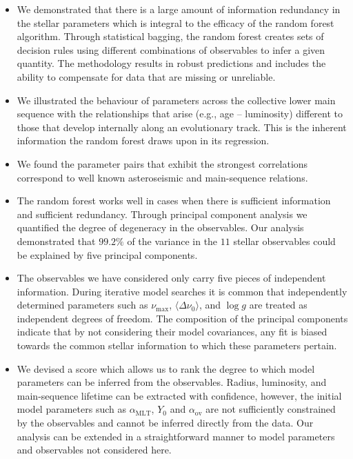 \begin{itemize}
   
             \item We demonstrated that there is a large amount of information redundancy in the stellar parameters which is integral to the efficacy of the random forest algorithm. Through statistical bagging, the random forest  creates sets of decision rules using different combinations of observables to infer a given quantity. The methodology results in  robust predictions and includes the ability to compensate for data that are missing or unreliable. 
             
          \item We illustrated the behaviour of parameters across the collective lower main sequence with the relationships that arise (e.g., age -- luminosity) different to those that develop internally along an evolutionary track. This is the inherent information the random forest draws upon in its regression.
     
         \item  We found the parameter pairs that exhibit the strongest correlations correspond to well known asteroseismic and main-sequence relations.        
         
 


   \item The random forest works well in cases when there is sufficient information and sufficient redundancy.
   Through principal component analysis we quantified the degree of degeneracy in the observables. 
   Our analysis demonstrated that $99.2\%$ of the variance in the $11$ stellar observables could be explained by five principal components.
       
             
 \item The observables we have considered only carry five pieces of independent information.
             During  iterative model searches it is common that independently determined parameters such as $\nu_{\max}$, ${\langle\Delta\nu_0\rangle}$, and ${\log{} g}$ are treated as independent degrees of freedom. The composition of the principal components indicate that by not considering their model covariances, any fit is biased towards the common stellar information to which these parameters pertain.
   

  \item We devised a score  which  allows us to rank the degree to which model parameters can be inferred from the observables.  Radius, luminosity, and main-sequence lifetime can be extracted  with confidence, however, the initial model parameters such as $\alpha_{\text{MLT}}$, $Y_0$ and $\alpha_{\text{ov}}$ are not sufficiently constrained by the observables and cannot be inferred directly from the data.  Our analysis can be extended in a straightforward manner to model parameters and observables not considered here.  
  

\end{itemize}
